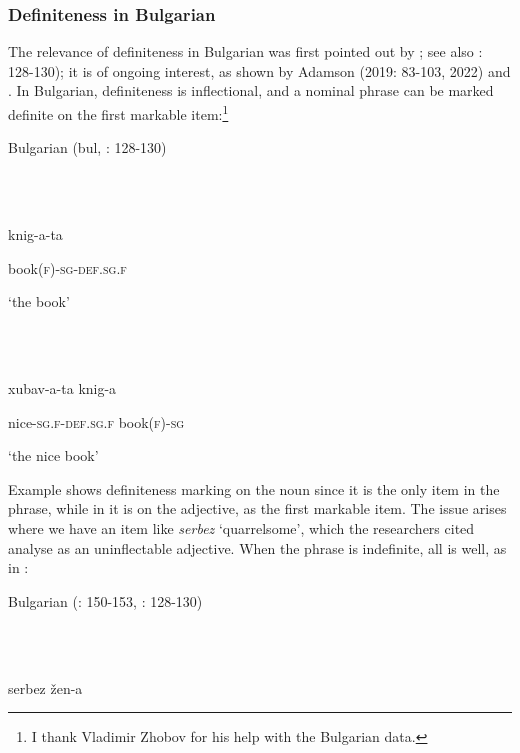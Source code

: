 \documentclass[output=paper]{langscibook}
\begin{document}
\subsubsection{\textbf{Definiteness} \textbf{in} \textbf{Bulgarian} }

The relevance of definiteness in Bulgarian was first pointed out by \citet[150-153]{Halpern1995}; see also \citealt{SpencerLuís2012}: 128-130); it is of ongoing interest, as shown by Adamson (2019: 83-103, 2022) and \citet{Georgieva2023}. In Bulgarian, definiteness is inflectional, and a nominal phrase can be marked definite on the first markable item:\footnote{ \textrm{I thank Vladimir Zhobov for his help with the Bulgarian data.} }

Bulgarian (bul, \citealt{SpencerLuís2012}: 128-130)

\ea%
    \label{ex:key:26}
    \gll \\
         \\
    \glt
    \z %

          knig-a-ta

  book(\textsc{f)-sg-def.sg.f}

  ‘the book’ 

\ea%
    \label{ex:key:27}
    \gll \\
         \\
    \glt
    \z %

          xubav-a-ta    knig-a

  nice-\textsc{sg.f-def.sg.f}  book\textsc{(f)-sg} 

  ‘the nice book’

Example  shows definiteness marking on the noun since it is the only item in the phrase, while in  it is on the adjective, as the first markable item. The issue arises where we have an item like \textit{serbez} ‘quarrelsome’, which the researchers cited analyse as an uninflectable adjective. When the phrase is indefinite, all is well, as in :

Bulgarian (\citealt{Halpern1995}: 150-153, \citealt{SpencerLuís2012}: 128-130)

\ea%
    \label{ex:key:28}
    \gll \\
         \\
    \glt
    \z %

          serbez    žen-a
\end{document}
